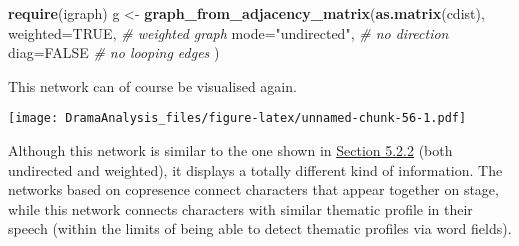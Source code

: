 \documentclass[]{book}
\newenvironment{Shaded}{\begin{snugshade}}{\end{snugshade}}
\newcommand{\CommentTok}[1]{\textcolor[rgb]{0.56,0.35,0.01}{\textit{#1}}}
\newcommand{\DataTypeTok}[1]{\textcolor[rgb]{0.13,0.29,0.53}{#1}}
\newcommand{\DecValTok}[1]{\textcolor[rgb]{0.00,0.00,0.81}{#1}}
\newcommand{\FloatTok}[1]{\textcolor[rgb]{0.00,0.00,0.81}{#1}}
\newcommand{\KeywordTok}[1]{\textcolor[rgb]{0.13,0.29,0.53}{\textbf{#1}}}
\newcommand{\NormalTok}[1]{#1}
\newcommand{\OperatorTok}[1]{\textcolor[rgb]{0.81,0.36,0.00}{\textbf{#1}}}
\newcommand{\OtherTok}[1]{\textcolor[rgb]{0.56,0.35,0.01}{#1}}
\newcommand{\StringTok}[1]{\textcolor[rgb]{0.31,0.60,0.02}{#1}}
\begin{document}
\begin{Shaded}
\begin{Highlighting}[]
\KeywordTok{require}\NormalTok{(igraph)}
\NormalTok{g <-}\StringTok{ }\KeywordTok{graph_from_adjacency_matrix}\NormalTok{(}\KeywordTok{as.matrix}\NormalTok{(cdist), }
                                 \DataTypeTok{weighted=}\OtherTok{TRUE}\NormalTok{,     }\CommentTok{# weighted graph}
                                 \DataTypeTok{mode=}\StringTok{"undirected"}\NormalTok{, }\CommentTok{# no direction}
                                 \DataTypeTok{diag=}\OtherTok{FALSE}         \CommentTok{# no looping edges}
\NormalTok{                                )}
\end{Highlighting}
\end{Shaded}

This network can of course be visualised again.

\begin{Shaded}
\end{Shaded}

\texttt{[image: DramaAnalysis\_files/figure-latex/unnamed-chunk-56-1.pdf]}

Although this network is similar to the one shown in \protect\hyperlink{network}{Section 5.2.2} (both undirected and weighted), it displays a totally different kind of information. The networks based on copresence connect characters that appear together on stage, while this network connects characters with similar thematic profile in their speech (within the limits of being able to detect thematic profiles via word fields).
\end{document}
